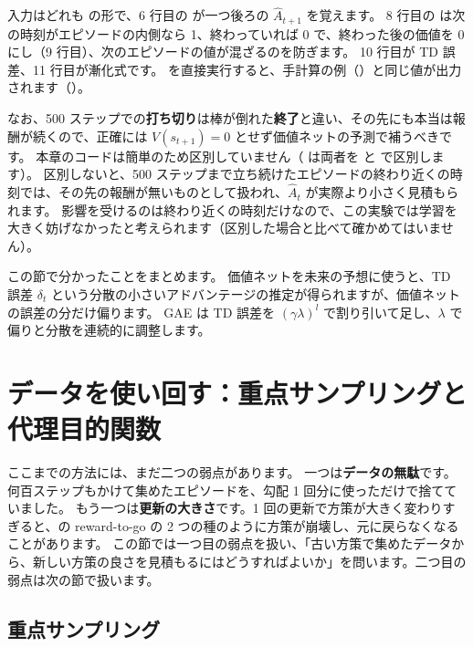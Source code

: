 
入力はどれも  の形で、6 行目の  が一つ後ろの $\hat{A}_{t+1}$ を覚えます。
8 行目の  は次の時刻がエピソードの内側なら 1、終わっていれば 0 で、終わった後の価値を 0 にし（9 行目）、次のエピソードの値が混ざるのを防ぎます。
10 行目が TD 誤差、11 行目が漸化式です。
 を直接実行すると、手計算の例（）と同じ値が出力されます（）。

なお、500 ステップでの\textbf{打ち切り}は棒が倒れた\textbf{終了}と違い、その先にも本当は報酬が続くので、正確には $V(s_{t+1})=0$ とせず価値ネットの予測で補うべきです。
本章のコードは簡単のため区別していません（ は両者を  と  で区別します）。
区別しないと、500 ステップまで立ち続けたエピソードの終わり近くの時刻では、その先の報酬が無いものとして扱われ、$\hat{A}_t$ が実際より小さく見積もられます。
影響を受けるのは終わり近くの時刻だけなので、この実験では学習を大きく妨げなかったと考えられます（区別した場合と比べて確かめてはいません）。

この節で分かったことをまとめます。
価値ネットを未来の予想に使うと、TD 誤差 $\delta_t$ という分散の小さいアドバンテージの推定が得られますが、価値ネットの誤差の分だけ偏ります。
GAE は TD 誤差を $(\gamma\lambda)^l$ で割り引いて足し、$\lambda$ で偏りと分散を連続的に調整します。

\section{データを使い回す：重点サンプリングと代理目的関数}\label{sec:pg-surrogate}

ここまでの方法には、まだ二つの弱点があります。
一つは\textbf{データの無駄}です。何百ステップもかけて集めたエピソードを、勾配 1 回分に使っただけで捨てていました。
もう一つは\textbf{更新の大きさ}です。1 回の更新で方策が大きく変わりすぎると、の reward-to-go の 2 つの種のように方策が崩壊し、元に戻らなくなることがあります。
この節では一つ目の弱点を扱い、「古い方策で集めたデータから、新しい方策の良さを見積もるにはどうすればよいか」を問います。二つ目の弱点は次の節で扱います。

\subsection*{重点サンプリング}

